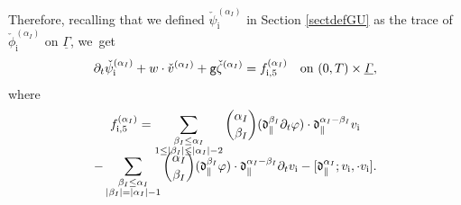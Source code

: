 \documentclass[10pt]{amsart}
\newcommand{\dpar}{{\mathfrak d}_{\parallel}}
\newcommand{\gr}{{\mathtt g}}
\newcommand{\dt}{\partial_t}
\newcommand{\ul}[1]{\underline{#1}}
\newcommand{\itGamma}{\mathit{\Gamma}}
\theoremstyle{definition}
\begin{document}
Therefore, recalling that we defined $\check\psi_\mathrm{i}^{(\alpha_I)}$ in Section \ref{sectdefGU} as the trace of
$\check{\phi}_\mathrm{i}^{(\alpha_I)}$ on $\ul{\itGamma}$, we~get
\begin{equation}\label{QLBC00}
\dt\check{\psi}_\mathrm{i}^{(\alpha_I)} + w\cdot\check{v}^{(\alpha_I)} + \gr\check{\zeta}^{(\alpha_I)} =f_{{\rm i},5}^{(\alpha_I)}
\quad\text{on } (0,T)\times\ul{\itGamma},
\end{equation}
where
\begin{multline*}
f_{{\rm i},5}^{(\alpha_I)}
= \sum_{\substack{\beta_I\leq\alpha_I\\ 1\leq|\beta_I|\leq|\alpha_I|-2}} \binom{\alpha_I}{\beta_I} (\dpar^{\beta_I}\dt\varphi)\cdot\dpar^{\alpha_I-\beta_I}v_\mathrm{i} \\[-8pt]
- \sum_{\substack{\beta_I\leq\alpha_I\\ |\beta_I|=|\alpha_I|-1}} \binom{\alpha_I}{\beta_I}(\dpar^{\beta_I}\varphi)\cdot\dpar^{\alpha_I-\beta_I}\dt v_\mathrm{i}
- [\dpar^{\alpha_I};v_\mathrm{i},\cdot v_\mathrm{i}].
\end{multline*}
\end{document}

